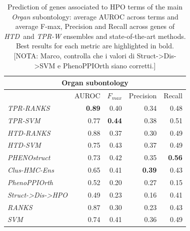 \documentclass{bioinfo}
\newcommand{\htd}{{\em HTD}}
\begin{document}
\begin{table}[!h]
\caption{Prediction of genes associated to HPO terms of the main {\em Organ} subontology: average AUROC across terms and average F-max, Precision and Recall across genes of \htd~and {\em TPR-W} ensembles and state-of-the-art methods. Best results for each metric are highlighted in bold. [NOTA: Marco, controlla che i valori di Struct->Dis->SVM e PhenoPPIOrth siano corretti.]}
\label{tab:best-results}  
\begin{center}
\begin{tabular}{|l|r|r|r|r|} 
\hline  
  \multicolumn{5}{|c|}{{\bf Organ subontology} }\\ \hline
     &  AUROC & $F_{max}$  &  Precision  & Recall \\ \hline
\textsl{TPR-RANKS}  	& {\bf 0.89} & 0.40 & 0.34 & 0.48 \\  \hline
\textsl{TPR-SVM}   	& 0.77 & {\bf 0.44} & 0.38 & 0.51	\\  \hline
\textsl{HTD-RANKS}  	& 0.88 & 0.37 & 0.30 & 0.49 \\  \hline
\textsl{HTD-SVM}	    & 0.75 & 0.43 & 0.37 & 0.49	\\  \hline \hline
\textsl{PHENOstruct}    & 0.73 & 0.42 & 0.35 & \bf{0.56}	\\  \hline 
\textsl{Clus-HMC-Ens}   & 0.65 & 0.41 & \bf{0.39} & 0.43		\\  \hline
\textsl{PhenoPPIOrth}   & 0.52 & 0.20 & 0.27 & 0.15  \\ \hline
\textsl{Struct->Dis->HPO} & 0.49 & 0.23 & 0.16 & 0.41  \\ \hline \hline
\textsl{RANKS} 		    & 0.87 & 0.30 & 0.23 & 0.43 \\ \hline
\textsl{SVM} 		    & 0.74 & 0.41 & 0.36 & 0.49 \\ \hline
\hline   
\end{tabular} 
\end{center}
\end{table}



\end{document}
